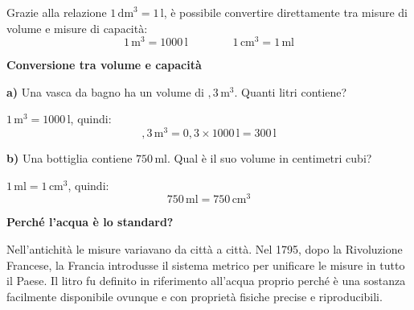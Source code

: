 \begin{center}
\end{center}

\begin{regola}
    Grazie alla relazione $1\,\text{dm}^3 = 1\,\text{l}$, è possibile convertire direttamente tra misure di volume e misure di capacità:
    \[
        1\,\text{m}^3 = 1000\,\text{l} \qquad\qquad 1\,\text{cm}^3 = 1\,\text{ml}
    \]
\end{regola}

\begin{esempio}
    \textbf{Conversione tra volume e capacità}

    \medskip
    \textbf{a)} Una vasca da bagno ha un volume di ${,}3\,\text{m}^3$. Quanti litri contiene?

    $1\,\text{m}^3 = 1000\,\text{l}$, quindi:
    \[
        {,}3\,\text{m}^3 = 0{,}3 \times 1000\,\text{l} = 300\,\text{l}
    \]

    \medskip
    \textbf{b)} Una bottiglia contiene $750\,\text{ml}$. Qual è il suo volume in centimetri cubi?

    $1\,\text{ml} = 1\,\text{cm}^3$, quindi:
    \[
        750\,\text{ml} = 750\,\text{cm}^3
    \]
\end{esempio}

\begin{sapevi}
    \textbf{Perché l'acqua è lo standard?}

    Nell'antichità le misure variavano da città a città. Nel 1795, dopo la Rivoluzione Francese, la Francia introdusse il sistema metrico per unificare le misure in tutto il Paese. Il litro fu definito in riferimento all'acqua proprio perché è una sostanza facilmente disponibile ovunque e con proprietà fisiche precise e riproducibili.
\end{sapevi}

